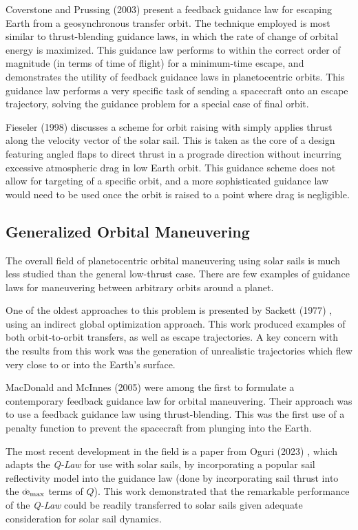 Coverstone and Prussing (2003) \cite{coverstone2003technique} present a feedback guidance law for escaping Earth from a geosynchronous transfer orbit. The technique employed is most similar to thrust-blending guidance laws, in which the rate of change of orbital energy is maximized. This guidance law performs to within the correct order of magnitude (in terms of time of flight) for a minimum-time escape, and demonstrates the utility of feedback guidance laws in planetocentric orbits. This guidance law performs a very specific task of sending a spacecraft onto an escape trajectory, solving the guidance problem for a special case of final orbit.

Fieseler (1998) \cite{fieseler1998method} discusses a scheme for orbit raising with simply applies thrust along the velocity vector of the solar sail. This is taken as the core of a design featuring angled flaps to direct thrust in a prograde direction without incurring excessive atmospheric drag in low Earth orbit. This guidance scheme does not allow for targeting of a specific orbit, and a more sophisticated guidance law would need to be used once the orbit is raised to a point where drag is negligible.

\subsection{Generalized Orbital Maneuvering}
The overall field of planetocentric orbital maneuvering using solar sails is much less studied than the general low-thrust case. There are few examples of guidance laws for maneuvering between arbitrary orbits around a planet.

One of the oldest approaches to this problem is presented by Sackett (1977) \cite{sackett1977optimal}, using an indirect global optimization approach. This work produced examples of both orbit-to-orbit transfers, as well as escape trajectories. A key concern with the results from this work was the generation of unrealistic trajectories which flew very close to or into the Earth's surface.

MacDonald and McInnes (2005) \cite{macdonald2005analytical} were among the first to formulate a contemporary feedback guidance law for orbital maneuvering. Their approach was to use a feedback guidance law using thrust-blending. This was the first use of a penalty function to prevent the spacecraft from plunging into the Earth.

The most recent development in the field is a paper from Oguri (2023) \cite{oguri2023solar}, which adapts the \textit{Q-Law} for use with solar sails, by incorporating a popular sail reflectivity model into the guidance law (done by incorporating sail thrust into the $\dot{\moe}_{\max}$ terms of $Q$). This work demonstrated that the remarkable performance of the \textit{Q-Law} could be readily transferred to solar sails given adequate consideration for solar sail dynamics.

